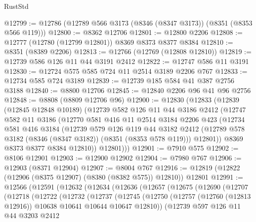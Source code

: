 \begin{lexlean}{RustStd}
\begin{coremodule}
{\begin{coremodule}
{{{{{{{{{{{{{{{{{{{{{{{{{{{{{{{{{{{{{{{{{{{{{{{{{{@12799 := @12786 (@12789 @566 @3173 (@8346 (@8347 @3173)) (@8351 (@8353 @566 @119)))
@12800 := @8362 @12706
@12801 := @12800 @2206
@12808 := @12777 (@12780 (@12799 @12801)) @8369 @8373 @8377 @8384
@12810 := @8351 (@8389 @2206)
@12813 := @12766 (@12769 (@12808 @12810))
@12819 := @12739 @586 @126 @11 @44 @3191 @2412
@12822 := @12747 @586 @11 @3191
@12830 := @12724 @575 @585 @724 @11 @2514 @3189 @2206 @767
@12833 := @12734 @585 @724 @3189
@12839 := @12739 @185 @584 @41 @387 @2756 @3188
@12840 := @8800 @12706
@12845 := @12840 @2206 @96 @41 @96 @2756
@12848 := @8808 (@8809 @12706 @96)
@12900 := @12830
    (@12833
      (@12839
        (@12845 @12848 @10189)
        (@12739
          @582
          @126
          @11
          @44
          @3186
          @2412
          (@12747
            @582
            @11
            @3186
            (@12770
              @581
              @416
              @11
              @2514
              @3184
              @2206
              @423
              (@12734
                @581
                @416
                @3184
                (@12739
                  @579
                  @126
                  @119
                  @44
                  @3182
                  @2412
                  (@12789 @578 @3182 (@8346 (@8347 @3182)) (@8351 (@8353 @578 @119)))
                  @12801))
              @8369
              @8373
              @8377
              @8384
              @12810))
          @12801)))
@12901 := @7910 @575
@12902 := @8106 @12901
@12903 := @12900 @12902
@12904 := @7980 @767
@12906 := @12903 (@8371 @12904)
@12907 := @8004 @767
@12916 := @12819 (@12822 (@12906 (@8375 @12907) (@8380 (@8382 @575)) @12810)) @12801
@12991 := @12566
    (@12591
      (@12632
        (@12634
          (@12636
            (@12657
              (@12675
                (@12690
                  (@12707
                    (@12718
                      (@12722
                        (@12732
                          (@12737
                            (@12745
                              (@12750
                                (@12757
                                  (@12760 (@12813 @12916))
                                  @10638
                                  @10641
                                  @10644
                                  @10647
                                  @12810))
                              (@12739
                                @597
                                @126
                                @11
                                @44
                                @3203
                                @2412
}}}}}}}}}}}}}}}}}}}}}}}}}}}}}}}}}}}}}}}}}}}}}}}}}}
\end{coremodule}}
\end{coremodule}
\end{lexlean}
